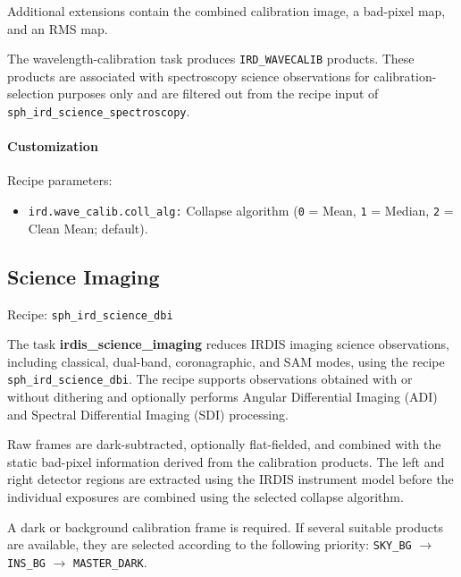 Additional extensions contain the combined calibration image, a bad-pixel map,
and an RMS map.

The wavelength-calibration task produces \texttt{IRD\_WAVECALIB} products.
These products are associated with spectroscopy science observations for
calibration-selection purposes only and are filtered out from the recipe input
of \texttt{sph\_ird\_science\_spectroscopy}.

\paragraph{Customization}

Recipe parameters:

\begin{itemize}

\item \texttt{ird.wave\_calib.coll\_alg:}
Collapse algorithm
(\texttt{0} = Mean,
 \texttt{1} = Median,
 \texttt{2} = Clean Mean; default).

\end{itemize}



\subsection{Science Imaging}

Recipe: \texttt{sph\_ird\_science\_dbi}

The task \textbf{irdis\_science\_imaging} reduces IRDIS imaging science observations, including classical, dual-band, coronagraphic, and SAM modes, using the recipe \texttt{sph\_ird\_science\_dbi}.
The recipe supports observations obtained with
or without dithering and optionally performs Angular Differential Imaging (ADI)
and Spectral Differential Imaging (SDI) processing.

Raw frames are dark-subtracted, optionally flat-fielded, and
combined with the static bad-pixel information derived from the calibration
products. The left and right detector regions are extracted using the IRDIS
instrument model before the individual exposures are combined using the selected
collapse algorithm.

A dark or background calibration frame is required. If several suitable
products are available, they are selected according to the following priority:
\texttt{SKY\_BG}
$\rightarrow$
\texttt{INS\_BG}
$\rightarrow$
\texttt{MASTER\_DARK}.

